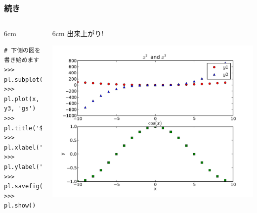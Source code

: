 \begin{frame}[t,fragile]
\frametitle{続き}
\begin{columns}
\begin{column}{6cm}
\begin{lstlisting}
# 下側の図を書き始めます
>>> pl.subplot(212)        
>>> pl.plot(x, y3, 'gs')
>>> pl.title('$\cos(x)$')
>>> pl.xlabel('x')
>>> pl.ylabel('y')
>>> pl.savefig('x3.pdf') 
>>> pl.show()
\end{lstlisting}
\end{column}
\begin{column}{6cm}
出来上がり!
\begin{center}
\includegraphics[width=\textwidth]{x3.pdf}
\end{center}
\end{column}
\end{columns}
\end{frame}

